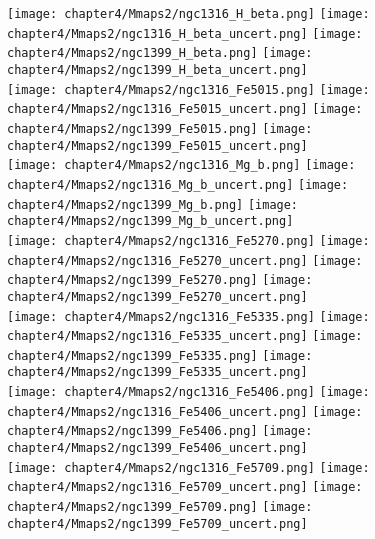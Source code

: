\begin{figure*}
	\centering
	\texttt{[image: chapter4/Mmaps2/ngc1316\_H\_beta.png]}
	\texttt{[image: chapter4/Mmaps2/ngc1316\_H\_beta\_uncert.png]}
	\texttt{[image: chapter4/Mmaps2/ngc1399\_H\_beta.png]}
	\texttt{[image: chapter4/Mmaps2/ngc1399\_H\_beta\_uncert.png]}
	\\
	\texttt{[image: chapter4/Mmaps2/ngc1316\_Fe5015.png]}
	\texttt{[image: chapter4/Mmaps2/ngc1316\_Fe5015\_uncert.png]}
	\texttt{[image: chapter4/Mmaps2/ngc1399\_Fe5015.png]}
	\texttt{[image: chapter4/Mmaps2/ngc1399\_Fe5015\_uncert.png]}
	\\
	\texttt{[image: chapter4/Mmaps2/ngc1316\_Mg\_b.png]}
	\texttt{[image: chapter4/Mmaps2/ngc1316\_Mg\_b\_uncert.png]}
	\texttt{[image: chapter4/Mmaps2/ngc1399\_Mg\_b.png]}
	\texttt{[image: chapter4/Mmaps2/ngc1399\_Mg\_b\_uncert.png]}
	\\
	\texttt{[image: chapter4/Mmaps2/ngc1316\_Fe5270.png]}
	\texttt{[image: chapter4/Mmaps2/ngc1316\_Fe5270\_uncert.png]}
	\texttt{[image: chapter4/Mmaps2/ngc1399\_Fe5270.png]}
	\texttt{[image: chapter4/Mmaps2/ngc1399\_Fe5270\_uncert.png]}
	\\
	\texttt{[image: chapter4/Mmaps2/ngc1316\_Fe5335.png]}
	\texttt{[image: chapter4/Mmaps2/ngc1316\_Fe5335\_uncert.png]}
	\texttt{[image: chapter4/Mmaps2/ngc1399\_Fe5335.png]}
	\texttt{[image: chapter4/Mmaps2/ngc1399\_Fe5335\_uncert.png]}
	\\
	\texttt{[image: chapter4/Mmaps2/ngc1316\_Fe5406.png]}
	\texttt{[image: chapter4/Mmaps2/ngc1316\_Fe5406\_uncert.png]}
	\texttt{[image: chapter4/Mmaps2/ngc1399\_Fe5406.png]}
	\texttt{[image: chapter4/Mmaps2/ngc1399\_Fe5406\_uncert.png]}
	\\
	\texttt{[image: chapter4/Mmaps2/ngc1316\_Fe5709.png]}
	\texttt{[image: chapter4/Mmaps2/ngc1316\_Fe5709\_uncert.png]}
	\texttt{[image: chapter4/Mmaps2/ngc1399\_Fe5709.png]}
	\texttt{[image: chapter4/Mmaps2/ngc1399\_Fe5709\_uncert.png]}
	\\
	\label{fig:MUSE_stellar2}
\end{figure*}

